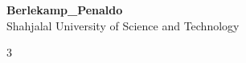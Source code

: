 \documentclass[9pt, a4paper]{extreport}
\begin{document}
\begin{center}
  {\huge \bfseries Berlekamp\_Penaldo}\\[0.3em]
  {\large Shahjalal University of Science and Technology}\\[0.2em]
\end{center}

\begin{multicols*}{3}
  \tableofcontents
  \vspace*{10pt}

  
\end{multicols*}
\end{document}
